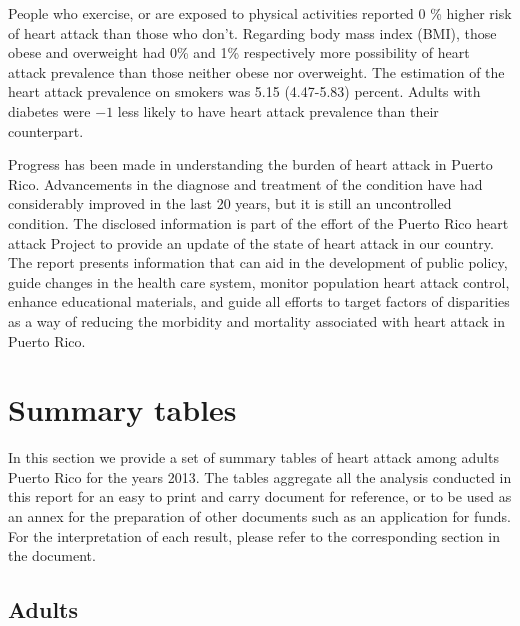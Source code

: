 People who exercise, or are exposed to physical activities reported 0 \% higher risk of heart attack than those who don't.  Regarding body mass index (BMI), those obese and overweight had 0\% and 1\% respectively more possibility of heart attack prevalence than those neither obese nor overweight. The estimation of the heart attack prevalence on smokers was 5.15 (4.47-5.83) percent.  Adults with diabetes were \ensuremath{-1}\5 less likely to have heart attack prevalence than their counterpart.



Progress has been made in understanding the burden of heart attack in Puerto Rico. Advancements in the diagnose and treatment of the condition have had considerably improved in the last 20 years, but it is still an uncontrolled condition. The disclosed information is part of the effort of the Puerto Rico heart attack Project to provide an update of the state of heart attack in our country. The report presents information that can aid in the development of public policy, guide changes in the health care system, monitor population heart attack control, enhance educational materials, and guide all efforts to target factors of disparities as a way of reducing the morbidity and mortality associated with heart attack in Puerto Rico.

\newpage
\section{Summary tables}
In this section we provide a set of summary tables of heart attack among adults Puerto Rico for the years 2013. The tables aggregate all the analysis conducted in this report for an easy to print and carry document for reference, or to be used as an annex for the preparation of other documents such as an application for funds. For the interpretation of each result, please refer to the corresponding section in the document.

\subsection{Adults}


